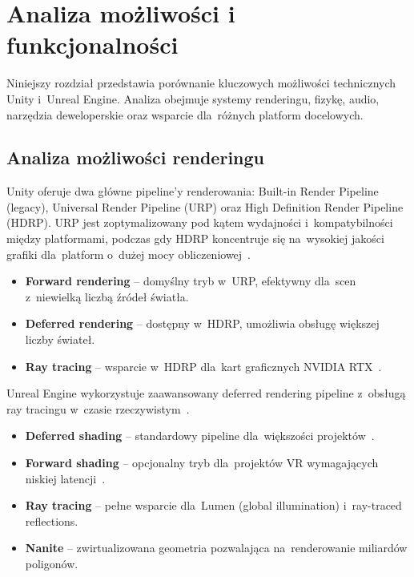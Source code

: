\clearpage
\section{Analiza możliwości i funkcjonalności}

Niniejszy rozdział przedstawia porównanie kluczowych możliwości technicznych Unity i~Unreal Engine. Analiza obejmuje systemy renderingu, fizykę, audio, narzędzia deweloperskie oraz wsparcie dla~różnych platform docelowych.

\subsection{Analiza możliwości renderingu}


Unity oferuje dwa główne pipeline'y renderowania: Built-in Render Pipeline (legacy), Universal Render Pipeline (URP) oraz High Definition Render Pipeline (HDRP). URP jest zoptymalizowany pod kątem wydajności i~kompatybilności między platformami, podczas gdy HDRP koncentruje się na~wysokiej jakości grafiki dla~platform o~dużej mocy obliczeniowej~\cite{gregory2018game}.

\begin{itemize}
    \item \textbf{Forward rendering} -- domyślny tryb w~URP, efektywny dla~scen z~niewielką liczbą źródeł światła.
    \item \textbf{Deferred rendering} -- dostępny w~HDRP, umożliwia obsługę większej liczby świateł.
    \item \textbf{Ray tracing} -- wsparcie w~HDRP dla~kart graficznych NVIDIA RTX~\cite{parker2010optix}.
\end{itemize}

Unreal Engine wykorzystuje zaawansowany deferred rendering pipeline z~obsługą ray tracingu w~czasie rzeczywistym~\cite{unreal_docs}.

\begin{itemize}
    \item \textbf{Deferred shading} -- standardowy pipeline dla~większości projektów~\cite{gregory2018game}.
    \item \textbf{Forward shading} -- opcjonalny tryb dla~projektów VR wymagających niskiej latencji~\cite{unreal_docs}.
    \item \textbf{Ray tracing} -- pełne wsparcie dla~Lumen (global illumination) i~ray-traced reflections.
    \item \textbf{Nanite} -- zwirtualizowana geometria pozwalająca na~renderowanie miliardów poligonów.
\end{itemize}


